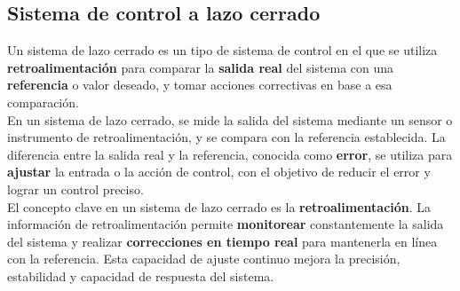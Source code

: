 \documentclass[
	12pt, %
	fleqn, %
	a4paper, %
	oneside, %
]{LegrandOrangeBook}
\begin{document}
\subsection{Sistema de control a lazo cerrado}
Un sistema de lazo cerrado es un tipo de sistema de control en el que se utiliza \textbf{retroalimentación} para comparar la \textbf{salida real} del sistema con una \textbf{referencia} o valor deseado, y tomar acciones correctivas en base a esa comparación.\\
En un sistema de lazo cerrado, se mide la salida del sistema mediante un sensor o instrumento de retroalimentación, y se compara con la referencia establecida. La diferencia entre la salida real y la referencia, conocida como \textbf{error}, se utiliza para \textbf{ajustar} la entrada o la acción de control, con el objetivo de reducir el error y lograr un control preciso.\\
El concepto clave en un sistema de lazo cerrado es la \textbf{retroalimentación}. La información de retroalimentación permite \textbf{monitorear} constantemente la salida del sistema y realizar \textbf{correcciones en tiempo real} para mantenerla en línea con la referencia. Esta capacidad de ajuste continuo mejora la precisión, estabilidad y capacidad de respuesta del sistema.
\end{document}
